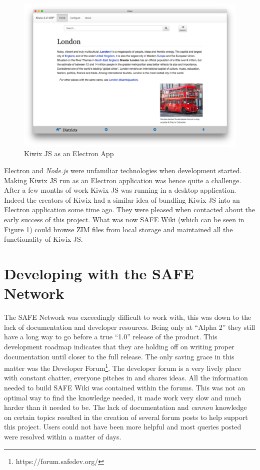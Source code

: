 \begin{figure}[h]
	\begin{center}
		\includegraphics[width=\textwidth]{images/kiwix-js-electron}
		\caption{Kiwix JS as an Electron App}
		\label{fig:kiwix-js-electron}
	\end{center}
\end{figure}

Electron and \textit{Node.js} were unfamiliar technologies when development started. Making Kiwix JS run as an Electron application was hence quite a challenge. After a few months of work Kiwix JS was running in a desktop application. Indeed the creators of Kiwix had a similar idea of bundling Kiwix JS into an Electron application some time ago. They were pleased when contacted about the early success of this project. What was now SAFE Wiki (which can be seen in Figure \ref{fig:kiwix-js-electron}) could browse ZIM files from local storage and maintained all the functionality of Kiwix JS.

\section{Developing with the SAFE Network}

The SAFE Network was exceedingly difficult to work with, this was down to the lack of documentation and developer resources. Being only at ``Alpha 2'' they still have a long way to go before a true ``1.0'' release of the product. This development roadmap indicates that they are holding off on writing proper documentation until closer to the full release. The only saving grace in this matter was the Developer Forum\footnote{https://forum.safedev.org/}. The developer forum is a very lively place with constant chatter, everyone pitches in and shares ideas. All the information needed to build SAFE Wiki was contained within the forums. This was not an optimal way to find the knowledge needed, it made work very slow and much harder than it needed to be. The lack of documentation and \textit{cannon} knowledge on certain topics resulted in the creation of several forum posts to help support this project. Users could not have been more helpful and most queries posted were resolved within a matter of days.

